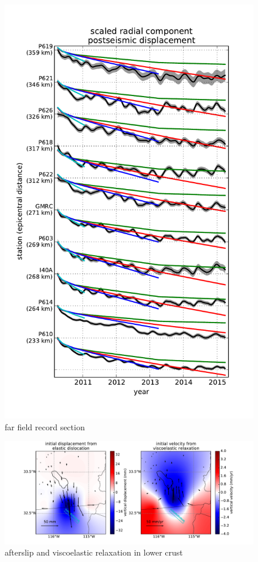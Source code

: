 \documentclass[12pt]{article}
\begin{document}
\begin{figure}
\includegraphics[scale=0.9]{Figures/far_field_record_section}
\centering 
\caption{far field record section}
\label{fig:FarFieldRS}
\end{figure}        

\begin{figure}
\includegraphics[scale=0.6]{Figures/lower_crust}
\centering 
\caption{afterslip and viscoelastic relaxation in lower crust}
\label{fig:LowerCrust}
\end{figure}
\end{document}
